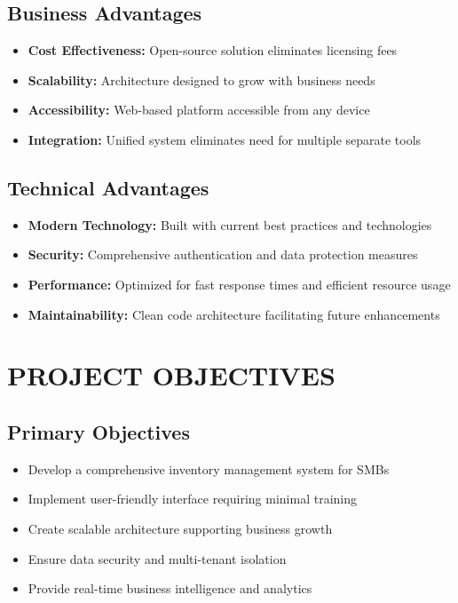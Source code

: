 \subsection{Business Advantages}
\begin{itemize}
\item \textbf{Cost Effectiveness:} Open-source solution eliminates licensing fees
\item \textbf{Scalability:} Architecture designed to grow with business needs
\item \textbf{Accessibility:} Web-based platform accessible from any device
\item \textbf{Integration:} Unified system eliminates need for multiple separate tools
\end{itemize}

\subsection{Technical Advantages}
\begin{itemize}
\item \textbf{Modern Technology:} Built with current best practices and technologies
\item \textbf{Security:} Comprehensive authentication and data protection measures
\item \textbf{Performance:} Optimized for fast response times and efficient resource usage
\item \textbf{Maintainability:} Clean code architecture facilitating future enhancements
\end{itemize}

\section{PROJECT OBJECTIVES}

\subsection{Primary Objectives}
\begin{itemize}
\item Develop a comprehensive inventory management system for SMBs
\item Implement user-friendly interface requiring minimal training
\item Create scalable architecture supporting business growth
\item Ensure data security and multi-tenant isolation
\item Provide real-time business intelligence and analytics
\end{itemize}

